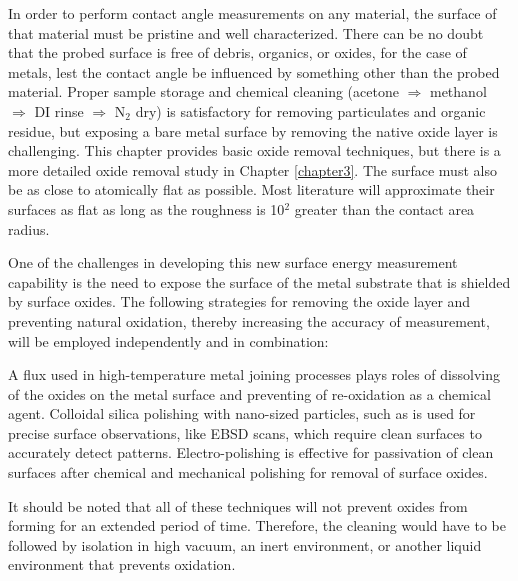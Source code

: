 In order to perform contact angle measurements on any material, the surface of that material must be pristine and well characterized. There can be no doubt that the probed surface is free of debris, organics, or oxides, for the case of metals, lest the contact angle be influenced by something other than the probed material. Proper sample storage and chemical cleaning (acetone $\Rightarrow$ methanol $ \Rightarrow $ DI rinse $ \Rightarrow $ N$_2$ dry) is satisfactory for removing particulates and organic residue, but exposing a bare metal surface by removing the native oxide layer is challenging. This chapter provides basic oxide removal techniques, but there is a more detailed oxide removal study in Chapter \ref{chapter3}. 
The surface must also be as close to atomically flat as possible. Most literature will approximate their surfaces as flat as long as the roughness is 10$^2$ greater than the contact area radius. 

One of the challenges in developing this new surface energy measurement capability is the need to expose the surface of the metal substrate that is shielded by surface oxides. The following strategies for removing the oxide layer and preventing  natural oxidation, thereby increasing the accuracy of measurement, will be employed independently and in combination:
\begin{outline}
	\1 A flux used in high-temperature metal joining processes plays roles of dissolving of the oxides on the metal surface and preventing of re-oxidation as a chemical agent.
	\1 Colloidal silica polishing with nano-sized particles, such as is used for precise surface observations, like EBSD scans, which require clean surfaces to accurately detect patterns.
	\1 Electro-polishing is effective for passivation of clean surfaces after chemical and mechanical polishing for removal of surface oxides. 
\end{outline}
It should be noted that all of these techniques will not prevent oxides from forming for an extended period of time. Therefore, the cleaning would have to be followed by isolation in high vacuum, an inert environment, or another liquid environment that prevents oxidation.

